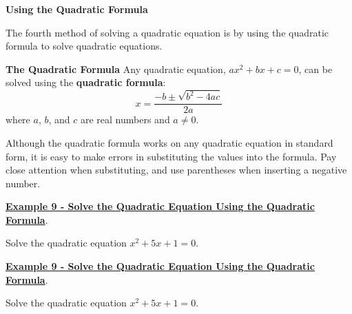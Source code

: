 \documentclass[12pt]{book}
\begin{document}
{\large \textbf{Using the Quadratic Formula}}
\vspace{3mm}

The fourth method of solving a quadratic equation is by using the quadratic formula to solve quadratic equations. 

\vspace{3mm}
\begin{boxR}
    \textbf{The Quadratic Formula}
    \vspace{1mm}
    \hline
    \vspace{2mm}
    Any quadratic equation, $ax^2+bx+c=0$, can be solved using the \textbf{quadratic formula}:
    $$ x = \frac{-b \pm \sqrt{b^2-4ac}}{2a}$$
    where $a$, $b$, and $c$ are real numbers and $a\neq 0$.
    
\end{boxR}

Although the quadratic formula works on any quadratic equation in standard form, it is easy to make errors in substituting the values into the formula. Pay close attention when substituting, and use parentheses when inserting a negative number.
\vspace{3mm}

 \underline{\textbf{Example 9 - Solve the Quadratic Equation Using the Quadratic Formula}}.

Solve the quadratic equation $x^2+5x+1=0$.


\newpage

\underline{\textbf{Example 9 - Solve the Quadratic Equation Using the Quadratic Formula}}.

Solve the quadratic equation $x^2+5x+1=0$.
\end{document}
